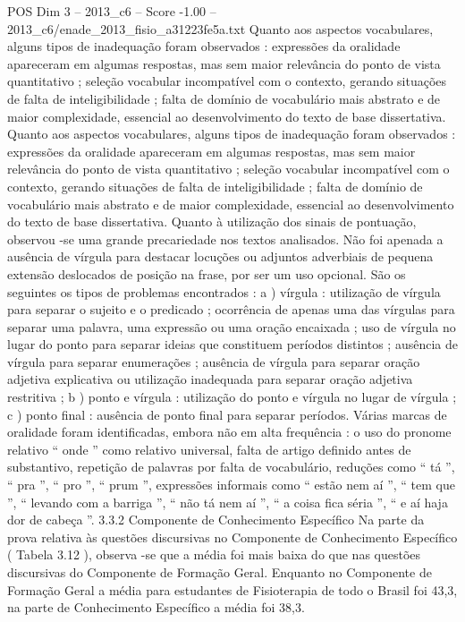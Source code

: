 \begin{textsample}{POS Dim 3 – 2013\_c6 – Score -1.00 – 2013\_c6/enade\_2013\_fisio\_a31223fe5a.txt}
Quanto aos aspectos vocabulares, alguns tipos de inadequação foram observados : expressões da oralidade apareceram em algumas respostas, mas sem maior relevância do ponto de vista quantitativo ; seleção vocabular incompatível com o contexto, gerando situações de falta de inteligibilidade ; falta de domínio de vocabulário mais abstrato e de maior complexidade, essencial ao desenvolvimento do texto de base dissertativa.
Quanto aos aspectos vocabulares, alguns tipos de inadequação foram observados : expressões da oralidade apareceram em algumas respostas, mas sem maior relevância do ponto de vista quantitativo ; seleção vocabular incompatível com o contexto, gerando situações de falta de inteligibilidade ; falta de domínio de vocabulário mais abstrato e de maior complexidade, essencial ao desenvolvimento do texto de base dissertativa.
Quanto à utilização dos sinais de pontuação, observou -se uma grande precariedade nos textos analisados.
Não foi apenada a ausência de vírgula para destacar locuções ou adjuntos adverbiais de pequena extensão deslocados de posição na frase, por ser um uso opcional.
São os seguintes os tipos de problemas encontrados : a ) vírgula : utilização de vírgula para separar o sujeito e o predicado ; ocorrência de apenas uma das vírgulas para separar uma palavra, uma expressão ou uma oração encaixada ; uso de vírgula no lugar do ponto para separar ideias que constituem períodos distintos ; ausência de vírgula para separar enumerações ; ausência de vírgula para separar oração adjetiva explicativa ou utilização inadequada para separar oração adjetiva restritiva ; b ) ponto e vírgula : utilização do ponto e vírgula no lugar de vírgula ; c ) ponto final : ausência de ponto final para separar períodos.
Várias marcas de oralidade foram identificadas, embora não em alta frequência : o uso do pronome relativo “ onde ” como relativo universal, falta de artigo definido antes de substantivo, repetição de palavras por falta de vocabulário, reduções como “ tá ”, “ pra ”, “ pro ”, “ prum ”, expressões informais como “ estão nem aí ”, “ tem que ”, “ levando com a barriga ”, “ não tá nem aí ”, “ a coisa fica séria ”, “ e aí haja dor de cabeça ”. 3.3.2 Componente de Conhecimento Específico Na parte da prova relativa às questões discursivas no Componente de Conhecimento Específico ( Tabela 3.12 ), observa -se que a média foi mais baixa do que nas questões discursivas do Componente de Formação Geral.
Enquanto no Componente de Formação Geral a média para estudantes de Fisioterapia de todo o Brasil foi 43,3, na parte de Conhecimento Específico a média foi 38,3.

\end{textsample}
